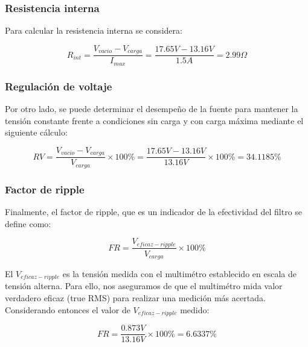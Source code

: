 \documentclass[chaptersright]{informeutn}
\begin{document}
        \subsubsection{Resistencia interna}
        
        Para calcular la resistencia interna se considera:

        \begin{equation*}
            R_{int} = \frac{V_{vacio} - V_{carga}}{I_{max}}= \frac{17.65V - 13.16V}{1.5A} = 2.99\Omega
        \end{equation*}

        \subsubsection{Regulación de voltaje}

        Por otro lado, se puede determinar el desempeño de la fuente para mantener la tensión constante frente a
        condiciones sin carga y con carga máxima mediante el siguiente cálculo:

        \begin{equation*}
            RV = \frac{V_{vacio} -V_{carga}}{V_{carga}} \times 100\% = \frac{17.65V-13.16V}{13.16V} \times 100\% = 34.1185\%
        \end{equation*}

        \subsubsection{Factor de ripple}
        
        Finalmente, el factor de ripple, que es un indicador de la efectividad del filtro se define como:

        \begin{equation*}
            FR = \frac{V_{eficaz-ripple}}{V_{carga}} \times 100\%
        \end{equation*}

        El $V_{eficaz-ripple}$ es la tensión medida con el multimétro establecido en escala de tensión alterna.
        Para ello, nos aseguramos de que el multimétro mida valor verdadero eficaz (true RMS) para realizar una
        medición más acertada. Considerando entonces el valor de $V_{eficaz-ripple}$ medido:

        \begin{equation*}
            FR = \frac{0.873V}{13.16V} \times 100\% = 6.6337\%
        \end{equation*}
\end{document}
